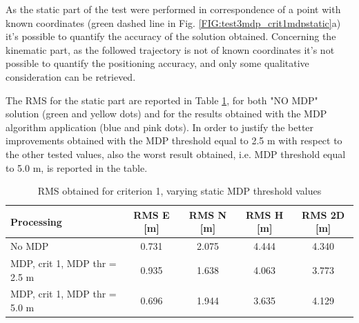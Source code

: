 As the static part of the test were performed in correspondence of a point with known coordinates (green dashed line in Fig. \ref{FIG:test3mdp_crit1mdpstatic}a) it's possible to quantify the accuracy of the solution obtained. Concerning the kinematic part, as the followed trajectory is not of known coordinates it's not possible to quantify the positioning accuracy, and only some qualitative consideration can be retrieved.

The RMS for the static part are reported in Table \ref{tab:test3mpd_crit1_mdp_static}, for both "NO MDP" solution (green and yellow dots) and for the results obtained with the MDP algorithm application (blue and pink dots). In order to justify the better improvements obtained with the MDP threshold equal to 2.5 m with respect to the other tested values, also the worst result obtained, i.e. MDP threshold equal to 5.0 m, is reported in the table.

\begin{table}[H]
	\centering
	\begin{tabular}{|p{5.5cm}|c|c|c|c|}
	\hline
	\textbf{Processing} & \textbf{RMS E [m]} & \textbf{RMS N [m]} &
	\textbf{RMS H [m]}&
	\textbf{RMS 2D [m]}\\
    \hline
	No MDP & 0.731 & 2.075& 4.444&4.340\\  
	\hline
	 MDP, crit 1, MDP thr = 2.5 m& 0.935 & 1.638& 4.063&3.773\\ 
    \hline
	 MDP, crit 1, MDP thr = 5.0 m& 0.696 & 1.944& 3.635&4.129\\ \hline
	\end{tabular} 
	\caption{RMS obtained for criterion 1, varying static MDP threshold values}
	\label{tab:test3mpd_crit1_mdp_static}
\end{table}

